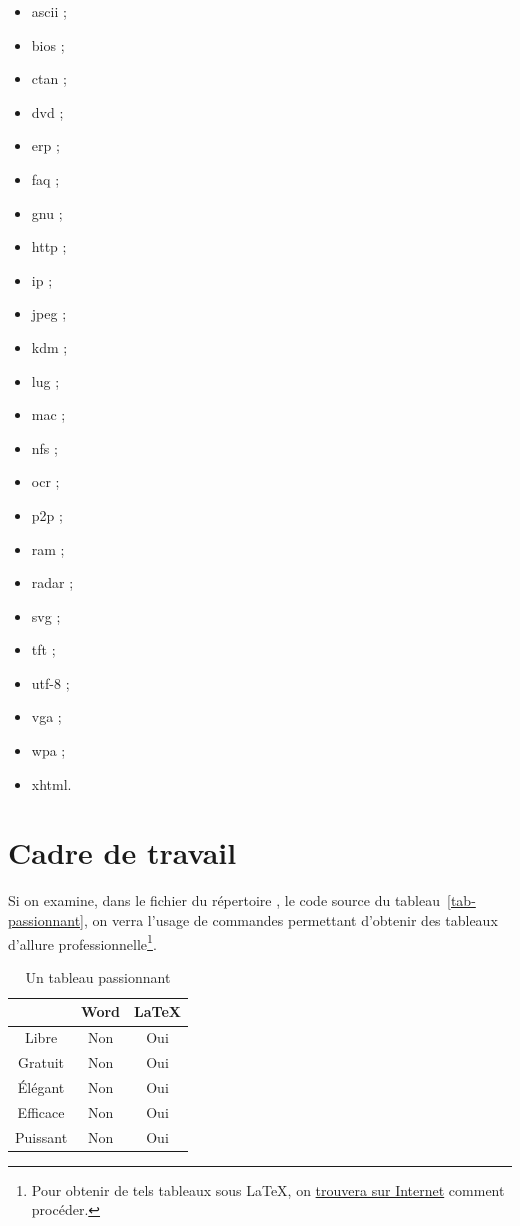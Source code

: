 \begin{itemize}
\item \gls{ascii} ;
\item \gls{bios} ;
\item \gls{ctan} ;
\item \gls{dvd} ;
\item \gls{erp} ;
\item \gls{faq} ;
\item \gls{gnu} ;
\item \gls{http} ;
\item \gls{ip} ;
\item \gls{jpeg} ;
\item \gls{kdm} ;
\item \gls{lug} ;
\item \gls{mac} ;
\item \gls{nfs} ;
\item \gls{ocr} ;
\item \gls{p2p} ;
\item \gls{ram} ;
\item \gls{radar} ;
\item \gls{svg} ;
\item \gls{tft} ;
\item \gls{utf-8} ;
\item \gls{vga} ;
\item \gls{wpa} ;
\item \gls{xhtml}.
\end{itemize}
%
\section{Cadre de travail}\label{sec-cadre}
%
Si on examine, dans le fichier
 du répertoire , le code source
du tableau~\vref{tab-passionnant}, on verra l'usage
de commandes permettant d'obtenir des tableaux d'allure
professionnelle\footnote{Pour obtenir de tels tableaux sous \LaTeX{}, on
  \href{http://www.tug.org/pracjourn/2007-1/mori/mori.pdf}{trouvera sur
    Internet} comment procéder.}.
%
\begin{table}[ht]
  \centering
  \begin{tabular}{ccc}
    \toprule
    \multicolumn{1}{c}{} & Word & \LaTeX{} \\
    \midrule
    Libre                & Non  & Oui      \\
    Gratuit              & Non  & Oui      \\
    Élégant              & Non  & Oui      \\
    Efficace             & Non  & Oui      \\
    Puissant             & Non  & Oui      \\
    \bottomrule
  \end{tabular}
  \caption{Un tableau passionnant}
  \label{tab-passionnant}
\end{table}

